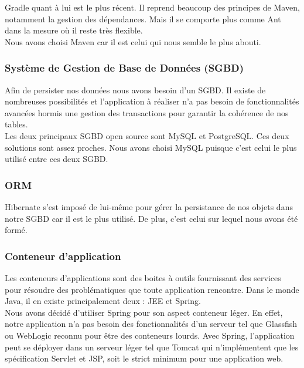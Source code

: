 Gradle quant à lui est le plus récent. Il reprend beaucoup des principes de Maven, notamment la gestion des dépendances. Mais il se comporte plus comme Ant dans la mesure où il reste très flexible.\\

Nous avons choisi Maven car il est celui qui nous semble le plus abouti.

\subsubsection{Système de Gestion de Base de Données (SGBD)}

Afin de persister nos données nous avons besoin d'un SGBD. Il existe de nombreuses possibilités et l'application à réaliser n'a pas besoin de fonctionnalités avancées hormis une gestion des transactions pour garantir la cohérence de nos tables.\\

Les deux principaux SGBD open source sont MySQL et PostgreSQL. Ces deux solutions sont assez proches. Nous avons choisi MySQL puisque c'est celui le plus utilisé entre ces deux SGBD.

\subsubsection{ORM}

Hibernate s'est imposé de lui-même pour gérer la persistance de nos objets dans notre SGBD car il est le plus utilisé. De plus, c'est celui sur lequel nous avons été formé.

\subsubsection{Conteneur d'application}

Les conteneurs d'applications sont des boites à outils fournissant des services pour résoudre des problématiques que toute application rencontre. Dans le monde Java, il en existe principalement deux : JEE et Spring.\\

Nous avons décidé d'utiliser Spring pour son aspect conteneur léger. En effet, notre application n'a pas besoin des fonctionnalités d'un serveur tel que Glassfish ou WebLogic reconnu pour être des conteneurs lourds. Avec Spring, l'application peut se déployer dans un serveur léger tel que Tomcat qui n'implémentent que les spécification Servlet et JSP, soit le strict minimum pour une application web.\\

